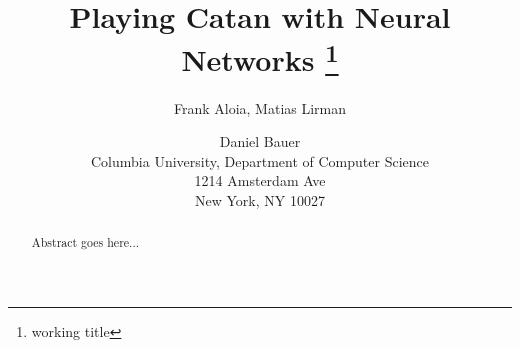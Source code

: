 \documentclass[letterpaper]{article} %
\begin{document}
%
\title{Playing Catan with Neural Networks \footnote{working title}}
\author{Frank Aloia, Matias Lirman \and Daniel Bauer\\
Columbia University, Department of Computer Science\\
1214 Amsterdam Ave\\
New York, NY 10027\\
}
\maketitle
\begin{abstract}
Abstract goes here...
\end{abstract}







\end{document}
